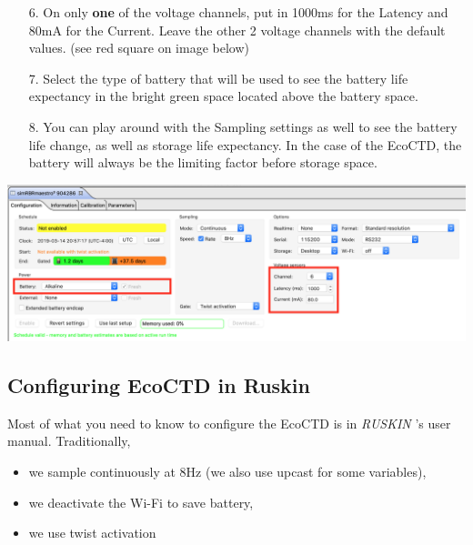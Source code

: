 \documentclass[13pt]{article}
\newcommand{\ruskin}{\textit{RUSKIN }}
\begin{document}
\begin{enumerate}
    \item[6.]  On only \textbf{one} of the voltage channels, put in 1000ms for the Latency and 80mA for the Current. Leave the other 2 voltage channels with the default values. (see red square on image below)
    \item[7.] Select the type of battery that will be used to see the battery life expectancy in the bright green space located above the battery space.
    \item[8.] You can play around with the Sampling settings as well to see the battery life change, as well as storage life expectancy. In the case of the EcoCTD, the battery will always be the limiting factor before storage space.
\end{enumerate}

\begin{center}
    \includegraphics[width = .5\linewidth]{EcoCTD_simulation2.png}
\end{center}

\subsection{Configuring EcoCTD in Ruskin}
Most of what you need to know to configure the EcoCTD is in \ruskin's user manual. Traditionally, \begin{itemize}
    \item we sample continuously at 8Hz (we also use upcast for some variables), 
    \item we deactivate the Wi-Fi to save battery, 
    \item we use twist activation
\end{itemize}
\end{document}
